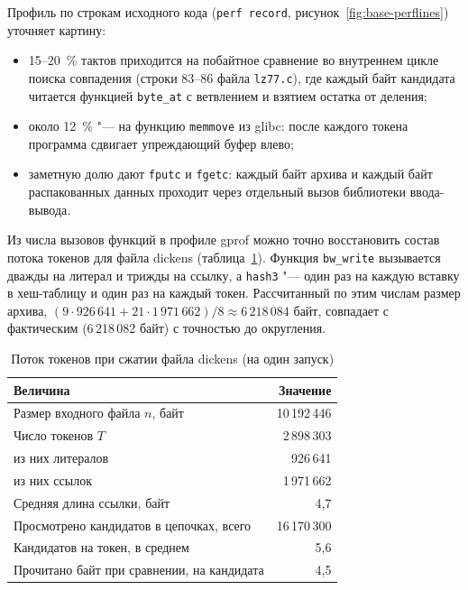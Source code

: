 
Профиль по строкам исходного кода (\texttt{perf record}, рисунок~\ref{fig:base-perflines})
уточняет картину:
\begin{itemize}
\item 15--20~\% тактов приходится на побайтное сравнение во внутреннем
цикле поиска совпадения (строки 83--86 файла \texttt{lz77.c}), где каждый
байт кандидата читается функцией \texttt{byte\_at} с ветвлением и
взятием остатка от деления;
\item около 12~\% "--- на функцию \texttt{memmove} из glibc: после каждого
токена программа сдвигает упреждающий буфер влево;
\item заметную долю дают \texttt{fputc} и \texttt{fgetc}: каждый байт
архива и каждый байт распакованных данных проходит через отдельный вызов
библиотеки ввода-вывода.
\end{itemize}


Из числа вызовов функций в профиле gprof можно точно восстановить состав
потока токенов для файла dickens (таблица~\ref{tab:tokens}). Функция
\texttt{bw\_write} вызывается дважды на литерал и трижды на ссылку, а
\texttt{hash3} "--- один раз на каждую вставку в хеш-таблицу и один раз на
каждый токен. Рассчитанный по этим числам размер архива,
$(9\cdot926\,641 + 21\cdot1\,971\,662)/8 \approx 6\,218\,084$ байт, совпадает с
фактическим (6\,218\,082 байт) с точностью до округления.

\begin{table}[H]
\caption{Поток токенов при сжатии файла dickens (на один запуск)}
\label{tab:tokens}
\begin{tabletext}
\centering
\begin{tabular}{|l|r|}
\hline
\textbf{Величина} & \textbf{Значение} \\
\hline
Размер входного файла $n$, байт & 10\,192\,446 \\
Число токенов $T$ & 2\,898\,303 \\
\quad из них литералов & 926\,641 \\
\quad из них ссылок & 1\,971\,662 \\
Средняя длина ссылки, байт & 4,7 \\
Просмотрено кандидатов в цепочках, всего & 16\,170\,300 \\
Кандидатов на токен, в среднем & 5,6 \\
Прочитано байт при сравнении, на кандидата & 4,5 \\
\hline
\end{tabular}
\end{tabletext}
\end{table}

